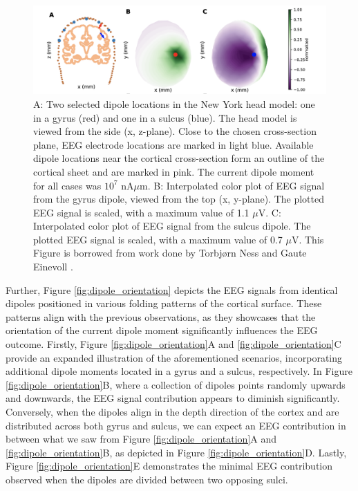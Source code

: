 \documentclass[a4paper, UKenglish, 11pt]{uiomaster}
\begin{document}
\begin{figure}[!htb]
    \centering
    \includegraphics[width=\linewidth]{figures/gyrus_and_sulcus_EEG.png}
    \caption{A: Two selected dipole locations in the New York head model: one in a gyrus (red) and one in a sulcus (blue). The head model is viewed from the side (x, z-plane). Close to the chosen cross-section plane, EEG electrode locations are marked in light blue. Available dipole locations near the cortical cross-section form an outline of the cortical sheet and are marked in pink. The current dipole moment for all cases was $10^7$ nA$\mu$m. B: Interpolated color plot of EEG signal from the gyrus dipole, viewed from the top (x, y-plane). The plotted EEG signal is scaled, with a maximum value of 1.1 $\mu$V. C: Interpolated color plot of EEG signal from the sulcus dipole. The plotted EEG signal is scaled, with a maximum value of 0.7 $\mu$V. This Figure is borrowed from work done by Torbjørn Ness and Gaute Einevoll \cite{naess2021biophysically}.}
    \label{fig:gyrus_and_sulcus_EEG}
\end{figure}

Further, Figure \ref{fig:dipole_orientation} depicts the EEG signals from identical dipoles positioned in various folding patterns of the cortical surface. These patterns align with the previous observations, as they showcases that the orientation of the current dipole moment significantly influences the EEG outcome. Firstly, Figure \ref{fig:dipole_orientation}A and \ref{fig:dipole_orientation}C provide an expanded illustration of the aforementioned scenarios, incorporating additional dipole moments located in a gyrus and a sulcus, respectively. In Figure \ref{fig:dipole_orientation}B, where a collection of dipoles points randomly upwards and downwards, the EEG signal contribution appears to diminish significantly. Conversely, when the dipoles align in the depth direction of the cortex and are distributed across both gyrus and sulcus, we can expect an EEG contribution in between what we saw from Figure \ref{fig:dipole_orientation}A and \ref{fig:dipole_orientation}B, as depicted in Figure \ref{fig:dipole_orientation}D. Lastly, Figure \ref{fig:dipole_orientation}E demonstrates the minimal EEG contribution observed when the dipoles are divided between two opposing sulci.
\end{document}
